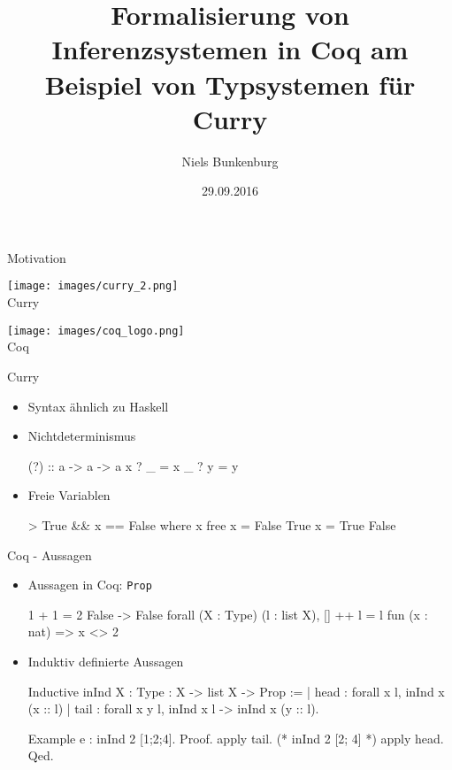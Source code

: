 \documentclass{beamer}
\title{Formalisierung von Inferenzsystemen in Coq am Beispiel von Typsystemen für Curry}
\author{Niels Bunkenburg}
\institute{ 
	Arbeitsgruppe für Programmiersprachen und Übersetzerkonstruktion \par
	Institut für Informatik \par
	Christian-Albrechts-Universität zu Kiel}
\date[Short Occasion] %
{29.09.2016}
\newcommand{\coqinline}[1]{\texttt{#1}}
\begin{document}
\begin{frame}
  \titlepage
\end{frame}

\begin{frame}{Motivation}
\hfill
\begin{minipage}[t]{.45 \linewidth}
	\centering
	\texttt{[image: images/curry\_2.png]}\\
	Curry
\end{minipage}
\hfill
\begin{minipage}[t]{.4 \linewidth}
	\centering
	\texttt{[image: images/coq\_logo.png]}\\
	Coq
\end{minipage}
\hfill
\end{frame}

\begin{frame}[fragile]{Curry}
\begin{itemize}
\item Syntax ähnlich zu Haskell
\item Nichtdeterminismus
\begin{haskellcode}
  (?)   :: a -> a -> a
  x ? _ = x
  _ ? y = y
\end{haskellcode}
\item Freie Variablen
\begin{coqcode}
> True && x == False where x free
  {x = False} True
  {x = True} False	
\end{coqcode}
\end{itemize}
\end{frame}
\begin{frame}[fragile]{Coq - Aussagen}
\begin{itemize}
\item Aussagen in Coq: \coqinline{Prop}
\begin{coqcode}
  1 + 1 = 2
  False -> False
  forall (X : Type) (l : list X), [] ++ l = l
  fun (x : nat) => x <> 2
\end{coqcode}
\vspace*{.5em}
\item Induktiv definierte Aussagen
\begin{coqcode}
  Inductive inInd {X : Type} : X -> list X -> Prop :=
    | head : forall x l, inInd x (x :: l)
    | tail : forall x y l, inInd x l -> inInd x (y :: l).

  Example e : inInd 2 [1;2;4].
  Proof.
    apply tail. (* inInd 2 [2; 4] *)
    apply head.
  Qed.
\end{coqcode}
\end{itemize}
\end{frame}
\end{document}
